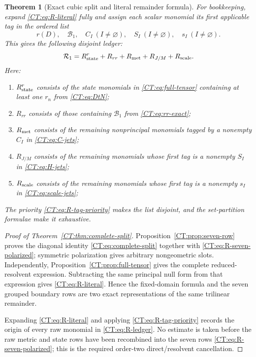 \documentclass[11pt]{amsart}
\numberwithin{equation}{section}
\newtheorem{theorem}{Theorem}[section]
\theoremstyle{definition}
\theoremstyle{remark}
\newcommand{\Rone}{\mathcal R_1}
\begin{document}
\begin{theorem}[Exact cubic split and literal remainder formula]
For bookkeeping, expand \eqref{CT:eq:R-literal} fully and assign each scalar
monomial its first applicable tag in the ordered list
\begin{equation}\label{CT:eq:R-tag-priority}
 r(D),\quad \mathcal B_1,\quad C_I\ (I\ne\varnothing),\quad
 S_I\ (I\ne\varnothing),\quad s_I\ (I\ne\varnothing).
\end{equation}
This gives the following disjoint ledger:
\begin{equation}\label{CT:eq:R-ledger}
 \Rone=R_{\rm state}^{r}+R_{rr}+R_{\rm met}
       +R_{J/M}+R_{\rm scale}.
\end{equation}
Here:
\begin{enumerate}
\item $R_{\rm state}^{r}$ consists of the state monomials in
\eqref{CT:eq:full-tensor} containing at least one $r_n$ from
\eqref{CT:eq:DtN};
\item $R_{rr}$ consists of those containing $\mathcal B_1$ from
\eqref{CT:eq:rr-exact};
\item $R_{\rm met}$ consists of the remaining nonprincipal monomials
tagged by a nonempty $C_I$ in \eqref{CT:eq:C-jets};
\item $R_{J/M}$ consists of the remaining monomials whose first tag is a
nonempty $S_I$ in \eqref{CT:eq:H-jets};
\item $R_{\rm scale}$ consists of the remaining monomials whose first tag
is a nonempty $s_I$ in \eqref{CT:eq:scale-jets};
\end{enumerate}
The priority \eqref{CT:eq:R-tag-priority} makes the list disjoint, and the
set-partition formulae make it exhaustive.
\end{theorem}

\begin{proof}[Proof of Theorem~\ref{CT:thm:complete-split}]
Proposition~\ref{CT:prop:seven-row} proves the diagonal identity
\eqref{CT:eq:complete-split} together with
\eqref{CT:eq:R-seven-polarized}; symmetric polarization gives arbitrary
nongeometric slots.  Independently, Proposition~\ref{CT:prop:full-tensor}
gives the complete reduced-resolvent expression.  Subtracting the same
principal null form from that expression gives \eqref{CT:eq:R-literal}.
Hence the fixed-domain formula and the seven grouped boundary rows are two
exact representations of the same trilinear remainder.

Expanding \eqref{CT:eq:R-literal} and applying
\eqref{CT:eq:R-tag-priority} records the origin of every raw monomial in
\eqref{CT:eq:R-ledger}.  No estimate is taken before the raw metric and state
rows have been recombined into the seven rows
\eqref{CT:eq:R-seven-polarized}; this is the required order-two
direct/resolvent cancellation.
\end{proof}
\end{document}
